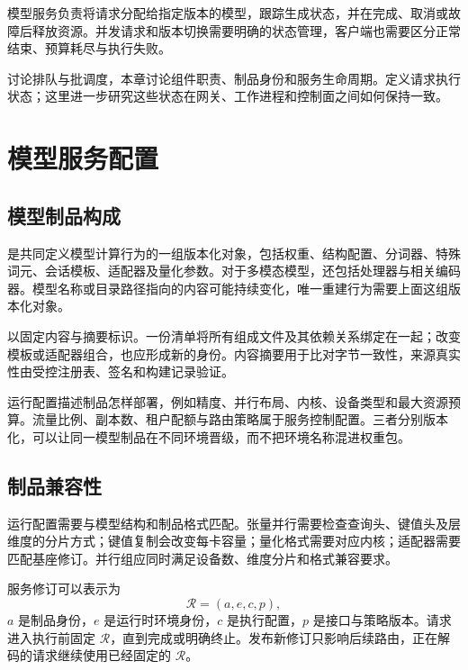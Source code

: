 \documentclass[../textbook.tex]{subfiles}
\begin{document}
\fi
{}

模型服务负责将请求分配给指定版本的模型，跟踪生成状态，并在完成、取消或故障后释放资源。并发请求和版本切换需要明确的状态管理，客户端也需要区分正常结束、预算耗尽与执行失败。

讨论排队与批调度，本章讨论组件职责、制品身份和服务生命周期。定义请求执行状态；这里进一步研究这些状态在网关、工作进程和控制面之间如何保持一致。

\section{模型服务配置}

\subsection{模型制品构成}
是共同定义模型计算行为的一组版本化对象，包括权重、结构配置、分词器、特殊词元、会话模板、适配器及量化参数。对于多模态模型，还包括处理器与相关编码器。模型名称或目录路径指向的内容可能持续变化，唯一重建行为需要上面这组版本化对象。

以固定内容与摘要标识。一份清单将所有组成文件及其依赖关系绑定在一起；改变模板或适配器组合，也应形成新的身份。内容摘要用于比对字节一致性，来源真实性由受控注册表、签名和构建记录验证。

运行配置描述制品怎样部署，例如精度、并行布局、内核、设备类型和最大资源预算。流量比例、副本数、租户配额与路由策略属于服务控制配置。三者分别版本化，可以让同一模型制品在不同环境晋级，而不把环境名称混进权重包。

\subsection{制品兼容性}
运行配置需要与模型结构和制品格式匹配。张量并行需要检查查询头、键值头及层维度的分片方式；键值复制会改变每卡容量；量化格式需要对应内核；适配器需要匹配基座修订。并行组应同时满足设备数、维度分片和格式兼容要求。

服务修订可以表示为
\begin{equation}
 \mathcal R=(a,e,c,p),
\end{equation}
$a$ 是制品身份，$e$ 是运行时环境身份，$c$ 是执行配置，$p$ 是接口与策略版本。请求进入执行前固定 $\mathcal R$，直到完成或明确终止。发布新修订只影响后续路由，正在解码的请求继续使用已经固定的 $\mathcal R$。
\end{document}
